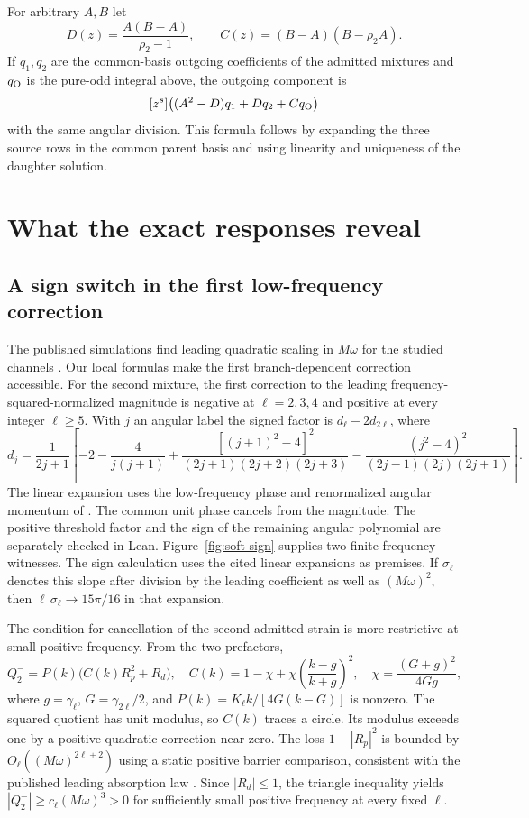 For arbitrary \(A,B\) let
\[
 D(z)=\frac{A(B-A)}{\rho_2-1},\qquad
 C(z)=(B-A)(B-\rho_2 A).
\]
If \(q_1,q_2\) are the common-basis outgoing coefficients of the admitted
mixtures and \(q_{\rm O}\) is the pure-odd integral above, the outgoing
component is
\[
 [z^s]\big((A^2-D)q_1 + Dq_2 + Cq_{\rm O}\big)
\]
with the same angular division. This formula follows by expanding the
three source rows in the common parent basis and using linearity and
uniqueness of the daughter solution.

\section{What the exact responses reveal}
\label{sec:followons}

\subsection{A sign switch in the first low-frequency correction}

The published simulations find leading quadratic scaling in \(M\omega\)
for the studied channels \cite{bucciotti}. Our local formulas make the
first branch-dependent correction accessible.
For the second mixture, the first correction to the leading
frequency-squared-normalized magnitude is negative at \(\ell=2,3,4\) and
positive at every integer \(\ell\ge5\). With \(j\) an angular label the
signed factor is \(d_\ell-2d_{2\ell}\), where
\[
 d_j=\frac{1}{2j+1}
   \left[-2-\frac{4}{j(j+1)}
     +\frac{[(j+1)^2-4]^2}{(2j+1)(2j+2)(2j+3)}
     -\frac{(j^2-4)^2}{(2j-1)(2j)(2j+1)}
   \right].
\]
The linear expansion uses the low-frequency phase and renormalized
angular momentum of \cite{dolan,mst}. The common unit phase cancels from
the magnitude. The positive threshold factor and the sign of the
remaining angular polynomial are separately checked in Lean.
Figure~\ref{fig:soft-sign} supplies two finite-frequency witnesses.
The sign calculation uses the cited linear expansions as premises.
If \(\sigma_\ell\) denotes this slope after division by the leading
coefficient as well as \((M\omega)^2\), then
\(\ell\,\sigma_\ell\to15\pi/16\) in that expansion.

The condition for cancellation of the second admitted strain is more
restrictive at small positive frequency. From the two prefactors,
\[
 Q^-_2=P(k)\big(C(k)R_p^2+R_d\big),\quad
 C(k)=1-\chi+\chi\left(\frac{k-g}{k+g}\right)^2,\quad
 \chi=\frac{(G+g)^2}{4Gg},
\]
where \(g=\gamma_\ell\), \(G=\gamma_{2\ell}/2\), and
\(P(k)=K_\ell k/[4G(k-G)]\) is nonzero.
The squared quotient has unit modulus, so \(C(k)\) traces a circle.
Its modulus exceeds one by a positive quadratic correction near zero.
The loss \(1-|R_p|^2\) is bounded by \(O_\ell((M\omega)^{2\ell+2})\)
using a static positive barrier comparison, consistent with the
published leading absorption law \cite{grayvisser}. Since
\(|R_d|\le1\), the triangle inequality yields
\(|Q^-_2|\ge c_\ell (M\omega)^3>0\) for sufficiently small positive
frequency at every fixed \(\ell\).

